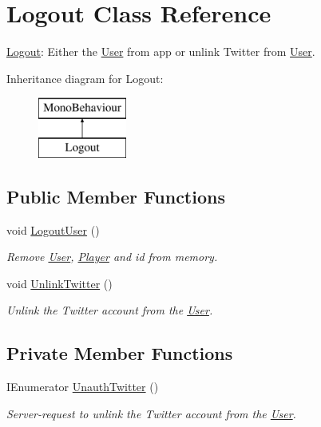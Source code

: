 \hypertarget{class_logout}{}\section{Logout Class Reference}
\label{class_logout}


\mbox{\hyperlink{class_logout}{Logout}}\+: Either the \mbox{\hyperlink{class_user}{User}} from app or unlink Twitter from \mbox{\hyperlink{class_user}{User}}.  


Inheritance diagram for Logout\+:\begin{figure}[H]
\begin{center}
\leavevmode
\includegraphics[height=2.000000cm]{class_logout}
\end{center}
\end{figure}
\subsection*{Public Member Functions}
\begin{DoxyCompactItemize}
\item 
\mbox{\label{class_logout_ad1bedba9ab92ee90679b995dfcc168cf}} 
void \mbox{\hyperlink{class_logout_ad1bedba9ab92ee90679b995dfcc168cf}{Logout\+User}} ()
\begin{DoxyCompactList}\small\item\em Remove \mbox{\hyperlink{class_user}{User}}, \mbox{\hyperlink{class_player}{Player}} and id from memory. \end{DoxyCompactList}\item 
\mbox{\label{class_logout_af1a3466e449f3a3d69ab1063051902c7}} 
void \mbox{\hyperlink{class_logout_af1a3466e449f3a3d69ab1063051902c7}{Unlink\+Twitter}} ()
\begin{DoxyCompactList}\small\item\em Unlink the Twitter account from the \mbox{\hyperlink{class_user}{User}}. \end{DoxyCompactList}\end{DoxyCompactItemize}
\subsection*{Private Member Functions}
\begin{DoxyCompactItemize}
\item 
\mbox{\label{class_logout_acab0eb6e5b954777d300611cb247c117}} 
I\+Enumerator \mbox{\hyperlink{class_logout_acab0eb6e5b954777d300611cb247c117}{Unauth\+Twitter}} ()
\begin{DoxyCompactList}\small\item\em Server-\/request to unlink the Twitter account from the \mbox{\hyperlink{class_user}{User}}. \end{DoxyCompactList}\end{DoxyCompactItemize}



